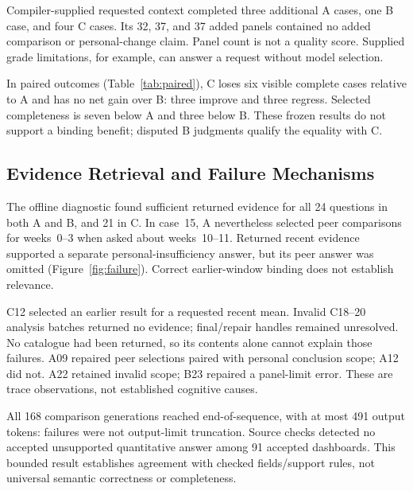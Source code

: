 Compiler-supplied requested context completed three additional A cases, one B case, and four C cases. Its 32, 37, and 37 added panels contained no added comparison or personal-change claim. Panel count is not a quality score. Supplied grade limitations, for example, can answer a request without model selection.

In paired outcomes (Table~\ref{tab:paired}), C loses six visible complete cases relative to A and has no net gain over B: three improve and three regress. Selected completeness is seven below A and three below B. These frozen results do not support a binding benefit; disputed B judgments qualify the equality with C.

\begin{table}[t]
\caption{Paired visible completeness on the same 24 people. ``Right only'' and ``Left only'' refer to the named contrast. Counts are descriptive, with no significance test.}
\label{tab:paired}
\centering\setlength{\tabcolsep}{3pt}

\end{table}

\subsection{Evidence Retrieval and Failure Mechanisms}
The offline diagnostic found sufficient returned evidence for all 24 questions in both A and B, and 21 in C. In case~15, A nevertheless selected peer comparisons for weeks~0--3 when asked about weeks~10--11. Returned recent evidence supported a separate personal-insufficiency answer, but its peer answer was omitted (Figure~\ref{fig:failure}). Correct earlier-window binding does not establish relevance.

C12 selected an earlier result for a requested recent mean. Invalid C18--20 analysis batches returned no evidence; final/repair handles remained unresolved. No catalogue had been returned, so its contents alone cannot explain those failures. A09 repaired peer selections paired with personal conclusion scope; A12 did not. A22 retained invalid scope; B23 repaired a panel-limit error. These are trace observations, not established cognitive causes.

All 168 comparison generations reached end-of-sequence, with at most 491 output tokens: failures were not output-limit truncation. Source checks detected no accepted unsupported quantitative answer among 91 accepted dashboards. This bounded result establishes agreement with checked fields/support rules, not universal semantic correctness or completeness.

